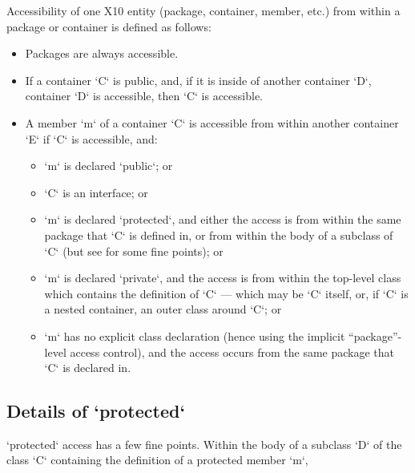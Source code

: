 Accessibility of one X10 entity (package, container, member, etc.) from within
a package or container is defined as follows: 
\begin{itemize}
\item Packages are always accessible.
\item If a container \xcd`C` is public, and, if it is inside of another
      container \xcd`D`,
      container \xcd`D` is accessible, then \xcd`C` is accessible.  
\item A member \xcd`m` of a container \xcd`C` is accessible from within
      another container  \xcd`E`
      if \xcd`C` is
      accessible, and: 
      \begin{itemize}
      \item \xcd`m` is declared \xcd`public`; or
      \item \xcd`C` is an interface; or
      \item \xcd`m` is declared \xcd`protected`, and either the access is from
            within the same package that \xcd`C` is defined in, or from within
            the body of a subclass of \xcd`C` (but see
             for some fine points); or
      \item \xcd`m` is declared \xcd`private`, and the access is from within
            the top-level class which contains the definition of \xcd`C` ---
            which may be \xcd`C` itself, or, if \xcd`C` is a nested container, an
            outer class around \xcd`C`; or
      \item \xcd`m` has no explicit class declaration (hence using the
            implicit ``package''-level access control), and the access occurs
            from the same package that \xcd`C` is declared in.
      \end{itemize}
\end{itemize}

\subsection{Details of \xcd`protected`}
\label{sect:protected-details}

\xcd`protected` access has a few fine points. 
Within the body of a subclass \xcd`D` of the class \xcd`C` containing
the definition of a protected member \xcd`m`, 

